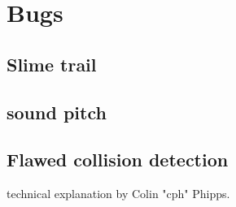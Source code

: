\section{Bugs}
\subsection{Slime trail}
\subsection{sound pitch}
\subsection{Flawed collision detection}
technical explanation by Colin "cph" Phipps.
